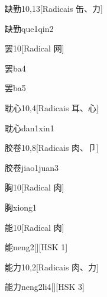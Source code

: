 \begin{entry}{缺勤}{10,13}[Radicais ⽸、⼒]
  \begin{phonetics}{缺勤}{que1qin2}
  \end{phonetics}
\end{entry}

\begin{entry}{罢}{10}[Radical ⽹]
  \begin{phonetics}{罢}{ba4}
  \end{phonetics}
  \begin{phonetics}{罢}{ba5}
  \end{phonetics}
\end{entry}

\begin{entry}{耽心}{10,4}[Radicais ⽿、⼼]
  \begin{phonetics}{耽心}{dan1xin1}
  \end{phonetics}
\end{entry}

\begin{entry}{胶卷}{10,8}[Radicais ⾁、⼙]
  \begin{phonetics}{胶卷}{jiao1juan3}
  \end{phonetics}
\end{entry}

\begin{entry}{胸}{10}[Radical ⾁]
  \begin{phonetics}{胸}{xiong1}
  \end{phonetics}
\end{entry}

\begin{entry}{能}{10}[Radical ⾁]
  \begin{phonetics}{能}{neng2}[][HSK 1]
  \end{phonetics}
\end{entry}

\begin{entry}{能力}{10,2}[Radicais ⾁、⼒]
  \begin{phonetics}{能力}{neng2li4}[][HSK 3]
  \end{phonetics}
\end{entry}

